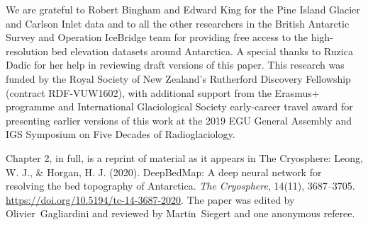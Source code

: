 We are grateful to Robert Bingham and Edward King for the Pine Island Glacier and Carlson Inlet data and to all the other researchers in the British Antarctic Survey and Operation IceBridge team for providing free access to the high-resolution bed elevation datasets around Antarctica.
A special thanks to Ruzica Dadic for her help in reviewing draft versions of this paper.
This research was funded by the Royal Society of New Zealand's Rutherford Discovery Fellowship (contract RDF-VUW1602), with additional support from the Erasmus+ programme and International Glaciological Society early-career travel award for presenting earlier versions of this work at the 2019 EGU General Assembly and IGS Symposium on Five Decades of Radioglaciology.

Chapter 2, in full, is a reprint of material as it appears in The Cryosphere:
Leong, W. J., \& Horgan, H. J. (2020). DeepBedMap: A deep neural network for resolving the bed topography of Antarctica. \textit{The Cryosphere}, 14(11), 3687–3705. \url{https://doi.org/10.5194/tc-14-3687-2020}.
The paper was edited by Olivier~Gagliardini and reviewed by Martin~Siegert and one anonymous referee.

